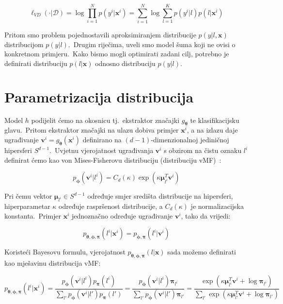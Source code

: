 \documentclass[diplomskirad]{fer}
\begin{document}
\begin{equation}
  \ell_{VD}(\cdot|\mathcal{D}) = \log \prod_{i=1}^{N} p(y^i | \bm{x}^i) = \sum_{i=1}^{N} \log \sum_{l=1}^{K} p(y^i | l) p(l | \bm{x}^i)
  \label{eq:vibe_initial}
\end{equation}

\pagebreak

Pritom smo problem pojednostavili aproksimiranjem distribucije $p(y | l, \bm{x})$ distribucijom $p(y | l)$.\ Drugim riječima, uveli smo model šuma koji ne ovisi o konkretnom primjeru.\ 
Kako bismo mogli optimirati zadani cilj, potrebno je definirati distribuciju $p(l | \bm{x})$ odnosno distribuciju $p(y | l)$.\

\section{Parametrizacija distribucija}
\label{sek:param}

Model $h$ podijelit ćemo na okosnicu tj.\ ekstraktor značajki $g_{\bm{\theta}}$ te klasifikacijsku glavu.\ 
Pritom ekstraktor značajki na ulazu dobiva primjer $\bm{x}^i$, a na izlazu daje ugrađivanje $\bm{v}^i = g_{\bm{\theta}}(\bm{x}^i)$ definirano na $(d - 1)$-dimenzionalnoj jediničnoj hipersferi $S^{d - 1}$.\ 
Uvjetnu vjerojatnost ugrađivanja $\bm{v}^i$ s obzirom na čistu oznaku $l^i$ definirat ćemo kao von Mises-Fisherovu distribuciju (distribuciju vMF)~\cite{banerjee2005clustering}:

\begin{equation}
  p_{\bm{\phi}}(\bm{v}^i | l^i) = C_d(\kappa) \exp(\kappa \bm{\mu}_{l^i}^T \bm{v}^i)
  \label{eq:p_v_l}
\end{equation}

Pri čemu vektor $\bm{\mu}_{l^i} \in S^{d - 1}$ određuje smjer središta distribucije na hipersferi, hiperparametar $\kappa$ određuje raspršenost distribucije, a $C_d(\kappa)$ je normalizacijska konstanta.\ 
Primjer $\bm{x}^i$ jednoznačno određuje ugrađivanje $\bm{v}^i$, tako da vrijedi:

\begin{equation}
  p_{\bm{\theta}, \bm{\phi}, \bm{\pi}}(l^i | \bm{x}^i) = p_{\bm{\phi}, \bm{\pi}}(l^i | \bm{v}^i)
  \label{eq:v_eq_x}
\end{equation}

Koristeći Bayesovu formulu, vjerojatnost $p_{\bm{\theta}, \bm{\phi}, \bm{\pi}}(l | \bm{x})$ sada možemo definirati kao mješavinu distribucija vMF:

\begin{equation}
  p_{\bm{\theta}, \bm{\phi}, \bm{\pi}}(l^i | \bm{x}^i) = \frac{p_{\bm{\phi}}(\bm{v}^i | l^i) p_{\bm{\pi}}(l^i)}{\sum_{l'} p_{\bm{\phi}}(\bm{v}^i | l') p_{\bm{\pi}}(l')}
                                                       = \frac{p_{\bm{\phi}}(\bm{v}^i | l^i) \bm{\pi}_{l^i}}{\sum_{l'} p_{\bm{\phi}}(\bm{v}^i | l') \bm{\pi}_{l'}}
                                                       = \frac{\exp(\kappa \bm{\mu}_{l^i}^T \bm{v}^i + \log \bm{\pi}_{l^i})}{\sum_{l'} \exp(\kappa \bm{\mu}_{l'}^T \bm{v}^i + \log \bm{\pi}_{l'})}
  \label{eq:p_l_x}
\end{equation}
\end{document}
